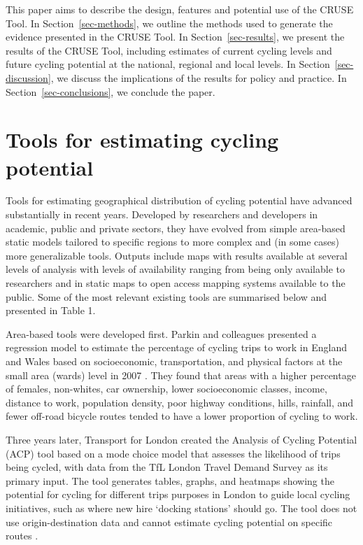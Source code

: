 \documentclass[
  super,
  preprint,
  3p]{elsarticle}
\begin{document}
This paper aims to describe the design, features and potential use of
the CRUSE Tool. In Section~\ref{sec-methods}, we outline the methods
used to generate the evidence presented in the CRUSE Tool. In
Section~\ref{sec-results}, we present the results of the CRUSE Tool,
including estimates of current cycling levels and future cycling
potential at the national, regional and local levels. In
Section~\ref{sec-discussion}, we discuss the implications of the results
for policy and practice. In Section~\ref{sec-conclusions}, we conclude
the paper.

\section{Tools for estimating cycling
potential}\label{tools-for-estimating-cycling-potential}

Tools for estimating geographical distribution of cycling potential have
advanced substantially in recent years. Developed by researchers and
developers in academic, public and private sectors, they have evolved
from simple area-based static models tailored to specific regions to
more complex and (in some cases) more generalizable tools. Outputs
include maps with results available at several levels of analysis with
levels of availability ranging from being only available to researchers
and in static maps to open access mapping systems available to the
public. Some of the most relevant existing tools are summarised below
and presented in Table 1.

Area-based tools were developed first. Parkin and colleagues presented a
regression model to estimate the percentage of cycling trips to work in
England and Wales based on socioeconomic, transportation, and physical
factors at the small area (wards) level in 2007
\citep{parkin_estimation_2007}. They found that areas with a higher
percentage of females, non-whites, car ownership, lower socioeconomic
classes, income, distance to work, population density, poor highway
conditions, hills, rainfall, and fewer off-road bicycle routes tended to
have a lower proportion of cycling to work.

Three years later, Transport for London created the Analysis of Cycling
Potential (ACP) tool based on a mode choice model that assesses the
likelihood of trips being cycled, with data from the TfL London Travel
Demand Survey as its primary input. The tool generates tables, graphs,
and heatmaps showing the potential for cycling for different trips
purposes in London to guide local cycling initiatives, such as where new
hire `docking stations' should go. The tool does not use
origin-destination data and cannot estimate cycling potential on
specific routes \citep{transport_for_london_analysis_2010}.
\end{document}
